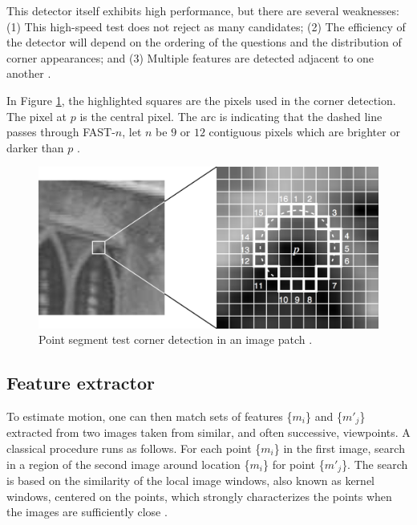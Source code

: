 This detector itself exhibits high performance, but there are several weaknesses: (1) This high-speed test does not reject as many candidates; (2) The efficiency of the detector will depend on the ordering of the questions and the distribution of corner appearances; and (3) Multiple features are detected adjacent to one another \cite{Rosten2010}.

In Figure \ref{figure:fast}, the highlighted squares are the pixels used in the corner detection. The pixel at $p$ is the central pixel. The arc is indicating that the dashed line passes through FAST-$n$, let $n$ be $9$ or $12$ contiguous pixels which are brighter or darker than $p$ \cite{Rosten2010}.

\begin{figure}[!htb]
  \centering
  \includegraphics[width=380pt]{chapters/tracking_library_for_the_web/fast.png}
  \caption{Point segment test corner detection in an image patch \cite{Glass2013}.}
  \label{figure:fast}
\end{figure}


\subsection{Feature extractor} %
\label{sub:tracking_library_for_the_web:marker_less_tracking_algorithm:feature_extractor}

To estimate motion, one can then match sets of features \{$m_{i}$\} and \{$m'_{j}$\} extracted from two images taken from similar, and often successive, viewpoints. A classical procedure \cite{Calonder2010} runs as follows. For each point \{$m_{i}$\} in the first image, search in a region of the second image around location \{$m_{i}$\} for point \{$m'_{j}$\}. The search is based on the similarity of the local image windows, also known as kernel windows, centered on the points, which strongly characterizes the points when the images are sufficiently close \cite{Lepetit2005}.

